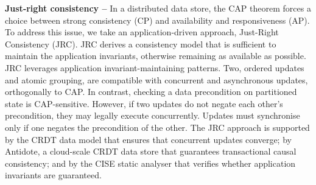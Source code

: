 \documentclass[a4paper,UKenglish]{dagrep-v2018}
\begin{document}

\license

\textbf{Just-right consistency --}
In a distributed data store, the CAP theorem forces a choice between strong consistency (CP) and availability and responsiveness (AP). To address this issue, we take an application-driven approach, Just-Right Consistency (JRC). JRC derives a consistency model that is sufficient to maintain the application invariants, otherwise remaining as available as possible.
JRC leverages application invariant-maintaining patterns. Two, ordered updates and atomic grouping, are compatible with concurrent and asynchronous updates, orthogonally to CAP. In contrast, checking a data precondition on partitioned state is CAP-sensitive. However, if two updates do not negate each other's precondition, they may legally execute concurrently. Updates must synchronise only if one negates the precondition of the other.
The JRC approach is supported by the CRDT data model that ensures that concurrent updates converge; by Antidote, a cloud-scale CRDT data store that guarantees transactional causal consistency; and by the CISE static analyser that verifies whether application invariants are guaranteed.
\end{document}
